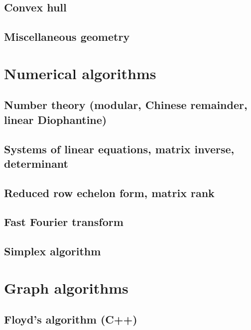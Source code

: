 \subsection{Convex hull}
\raggedbottom
\hrulefill
\subsection{Miscellaneous geometry}
\raggedbottom
\hrulefill

\section{Numerical algorithms}
\subsection{Number theory (modular, Chinese remainder, linear Diophantine)}
\raggedbottom
\hrulefill
\subsection{Systems of linear equations, matrix inverse, determinant}
\raggedbottom
\hrulefill
\subsection{Reduced row echelon form, matrix rank}
\raggedbottom
\hrulefill
\subsection{Fast Fourier transform}
\raggedbottom
\hrulefill
\subsection{Simplex algorithm}
\raggedbottom
\hrulefill

\section{Graph algorithms}
\subsection{Floyd's algorithm (C++)}
\raggedbottom
\hrulefill
